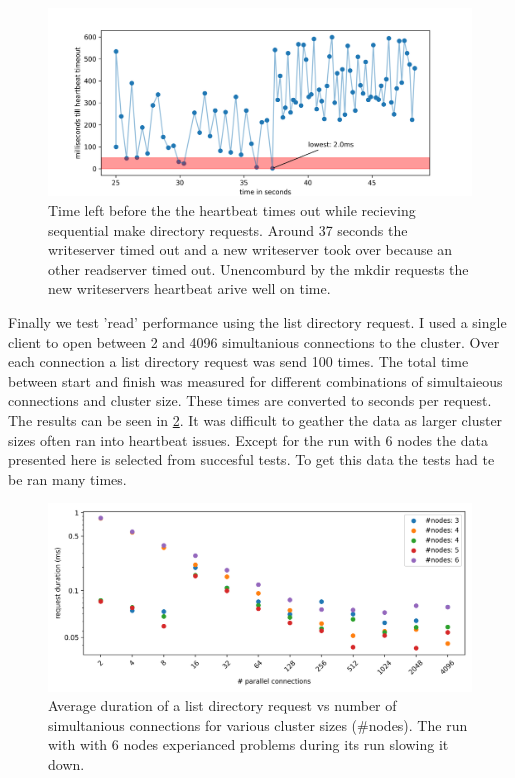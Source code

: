 \begin{figure}[htbp]
	\centering
	\includegraphics{../data/hb_timeout.png}
	\caption{Time left before the the heartbeat times out while recieving sequential make directory requests. Around 37 seconds the writeserver timed out and a new writeserver took over because an other readserver timed out. Unencomburd by the mkdir requests the new writeservers heartbeat arive well on time.}
	\label{fig:hbt}
\end{figure}

Finally we test 'read' performance using the list directory request. I used a single client to open between 2 and 4096 simultanious connections to the cluster. Over each connection a list directory request was send 100 times. The total time between start and finish was measured for different combinations of simultaieous connections and cluster size. These times are converted to seconds per request. The results can be seen in \cref{fig:ls}. 
It was difficult to geather the data as larger cluster sizes often ran into heartbeat issues. Except for the run with 6 nodes the data presented here is selected from succesful tests. To get this data the tests had te be ran many times.

\begin{figure}[htbp]
	\centering
	\includegraphics{../data/ls_request_dur.png}
	\caption{Average duration of a list directory request vs number of simultanious connections for various cluster sizes (\#nodes). The run with with 6 nodes experianced problems during its run slowing it down.}
	\label{fig:ls}
\end{figure}
